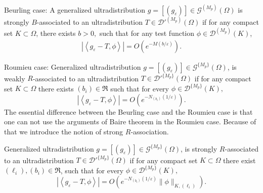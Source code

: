 \documentclass[sn-mathphys,Numbered]{sn-jnl}%
\theoremstyle{thmstyleone}%
\theoremstyle{thmstyletwo}%
\theoremstyle{thmstylethree}%
\begin{document}
Beurling case: A generalized ultradistribution $g=[(g_{\varepsilon})]\in\mathcal G^{(M_p)}(\Omega)$ is  strongly $B$-associated to an ultradistribution $T\in\mathcal D'^{(M_p)}(\Omega)$ if for any compact set $K\subset\Omega$, there exists $b >0,$  such that for  any test function $\phi\in\mathcal D^{(M_p)}(K)$, 
\begin{align} \label{bc1}
\left|\left\langle g_{\varepsilon} -T, \phi\right\rangle \right| = O\left(e^{-{M}({b}/{\varepsilon})}\right). 
\end{align}





Roumieu case:
Generalized ultradistribution $g=[(g_{\varepsilon})]\in\mathcal G^{\{M_p\}}(\Omega)$, is  weakly $R$-associated to an ultradistribution $T\in\mathcal D'^{\{M_p\}}(\Omega)$  if for any compact set $K\subset\Omega$ there exists
$(b_i)\in\mathfrak R$ such that for every  $\phi\in\mathcal D^{\{M_p\}}(K),$
\begin{equation}\label{RC}
\left|\left\langle g_{\varepsilon} -T,\phi\right\rangle\right|=O\left(e^{-N_{(b_i)}(1/\varepsilon)}\right).
\end{equation}
The essential difference between the Beurling case and the Roumieu case is that one can not use the arguments of Baire theorem in the Roumieu case. Because of that we introduce the notion  of strong  $R$-association.

Generalized ultradistribution
$g=[(g_{\varepsilon})]\in\mathcal G^{\{M_p\}}(\Omega)$, is strongly $R$-associated to an ultradistribution $T\in\mathcal D'^{\{M_p\}}(\Omega)$  if for any compact set $K\subset\Omega$
there exist   $(\ell_i), (b_i)\in\mathfrak R$,  such that for every $\phi\in\mathcal D^{\{M_p\}}(K),$
\begin{equation}\label{RCpr}
\left|\left\langle g_{\varepsilon} -T,\phi\right\rangle\right|=O\left(e^{-N_{(b_i)}(1/\varepsilon)}\|\phi\|_{K,(\ell_i)}\right).
\end{equation}
\end{document}
